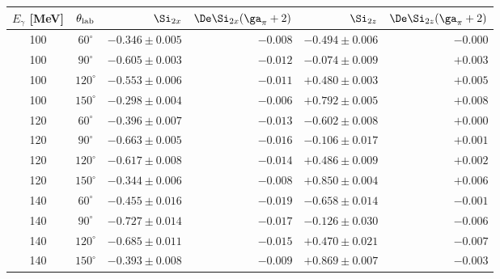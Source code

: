 \begin{tabular}{ccrrrr}
\hline
$E_\gamma$ [MeV] & $\theta_{\rm lab}$ & $\Si_{2x}$ & $\De\Si_{2x}(\ga_\pi+2)$ & $\Si_{2z}$ & $\De\Si_{2z}(\ga_\pi+2)$ \\
\hline
100 & $60^\circ$ & $-0.346 \pm 0.005$ & $-0.008$ & $-0.494 \pm 0.006$ & $-0.000$ \\
100 & $90^\circ$ & $-0.605 \pm 0.003$ & $-0.012$ & $-0.074 \pm 0.009$ & $+0.003$ \\
100 & $120^\circ$ & $-0.553 \pm 0.006$ & $-0.011$ & $+0.480 \pm 0.003$ & $+0.005$ \\
100 & $150^\circ$ & $-0.298 \pm 0.004$ & $-0.006$ & $+0.792 \pm 0.005$ & $+0.008$ \\
120 & $60^\circ$ & $-0.396 \pm 0.007$ & $-0.013$ & $-0.602 \pm 0.008$ & $+0.000$ \\
120 & $90^\circ$ & $-0.663 \pm 0.005$ & $-0.016$ & $-0.106 \pm 0.017$ & $+0.001$ \\
120 & $120^\circ$ & $-0.617 \pm 0.008$ & $-0.014$ & $+0.486 \pm 0.009$ & $+0.002$ \\
120 & $150^\circ$ & $-0.344 \pm 0.006$ & $-0.008$ & $+0.850 \pm 0.004$ & $+0.006$ \\
140 & $60^\circ$ & $-0.455 \pm 0.016$ & $-0.019$ & $-0.658 \pm 0.014$ & $-0.001$ \\
140 & $90^\circ$ & $-0.727 \pm 0.014$ & $-0.017$ & $-0.126 \pm 0.030$ & $-0.006$ \\
140 & $120^\circ$ & $-0.685 \pm 0.011$ & $-0.015$ & $+0.470 \pm 0.021$ & $-0.007$ \\
140 & $150^\circ$ & $-0.393 \pm 0.008$ & $-0.009$ & $+0.869 \pm 0.007$ & $-0.003$ \\
\hline
\end{tabular}
